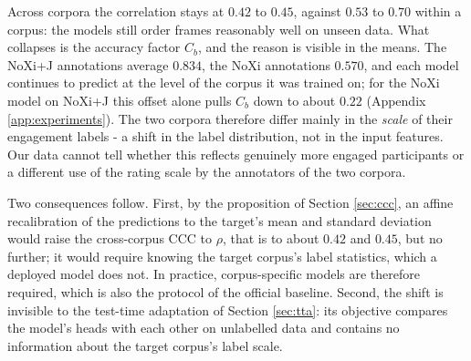 \documentclass[10pt,a4paper,twocolumn]{article}
\begin{document}
	Across corpora the correlation stays at $0.42$ to $0.45$, against $0.53$ to $0.70$ within a corpus: the models still order frames reasonably well on unseen data. What collapses is the accuracy factor $C_b$, and the reason is visible in the means. The NoXi+J annotations average $0.834$, the NoXi annotations $0.570$, and each model continues to predict at the level of the corpus it was trained on; for the NoXi model on NoXi+J this offset alone pulls $C_b$ down to about $0.22$ (Appendix \ref{app:experiments}). The two corpora therefore differ mainly in the \emph{scale} of their engagement labels - a shift in the label distribution, not in the input features. Our data cannot tell whether this reflects genuinely more engaged participants or a different use of the rating scale by the annotators of the two corpora.

	Two consequences follow. First, by the proposition of Section \ref{sec:ccc}, an affine recalibration of the predictions to the target's mean and standard deviation would raise the cross-corpus CCC to $\rho$, that is to about $0.42$ and $0.45$, but no further; it would require knowing the target corpus's label statistics, which a deployed model does not. In practice, corpus-specific models are therefore required, which is also the protocol of the official baseline. Second, the shift is invisible to the test-time adaptation of Section \ref{sec:tta}: its objective compares the model's heads with each other on unlabelled data and contains no information about the target corpus's label scale.
\end{document}
